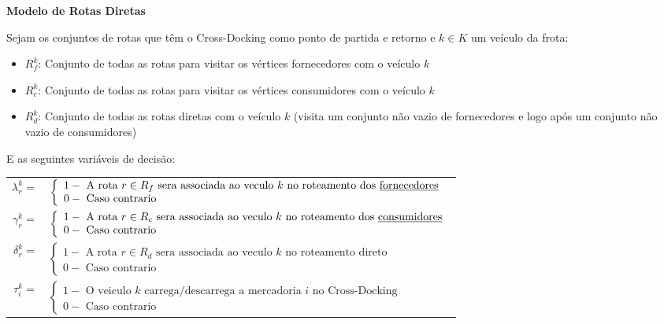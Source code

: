 \documentclass[12pt]{article}
\begin{document}
\begin{center}
\textbf{Modelo de Rotas Diretas}
\end{center}

\vspace{5mm}

\noindent Sejam os conjuntos de rotas que t\^em o Cross-Docking como ponto de partida e retorno e $k \in K$ um ve\'iculo da frota:
\begin{itemize}
  \item $R_f^k$: Conjunto de todas as rotas para visitar os v\'ertices fornecedores com o ve\'iculo $k$
  \item $R_c^k$: Conjunto de todas as rotas para visitar os v\'ertices consumidores com o ve\'iculo $k$
  \item $R_d^k$: Conjunto de todas as rotas diretas com o ve\'iculo $k$ (visita um conjunto n\~ao vazio de fornecedores e logo ap\'os um conjunto n\~ao vazio de consumidores)
\end{itemize}


\noindent E as seguintes vari\'aveis de decis\~ao:
\begin{table}[!htb]
\begin{tabular}{rl}
\vspace{1mm}
$\lambda^k_r = $ &
$\left\{
\begin{array} {l}
1 - \textrm{ A rota } r \in R_f \textrm{ sera associada ao veculo } k \textrm{ no roteamento dos \underline{fornecedores}} \\
0 - \textrm{ Caso contrario}
\end{array} \right.
$
\\
\vspace{2mm}
$\gamma^k_r = $ &
$\left\{
\begin{array} {l}
1 - \textrm{ A rota } r \in R_c \textrm{ sera associada ao veculo } k \textrm{ no roteamento dos \underline{consumidores}} \\
0 - \textrm{ Caso contrario}
\end{array} \right.
$
\\
\vspace{2mm}
$\delta^k_r = $ &
$\left\{
\begin{array} {l}
1 - \textrm{ A rota } r \in R_d \textrm{ sera associada ao veculo } k \textrm{ no roteamento direto} \\
0 - \textrm{ Caso contrario}
\end{array} \right.
$
\\
\vspace{1mm}
$\tau^k_i = $ &
$\left\{
\begin{array} {l}
1 - \textrm{ O veiculo } k \textrm{ carrega/descarrega a mercadoria } i \textrm{ no Cross-Docking}\\
0 - \textrm{ Caso contrario } 
\end{array} \right.
$
\end{tabular}
\end{table}
\end{document}
